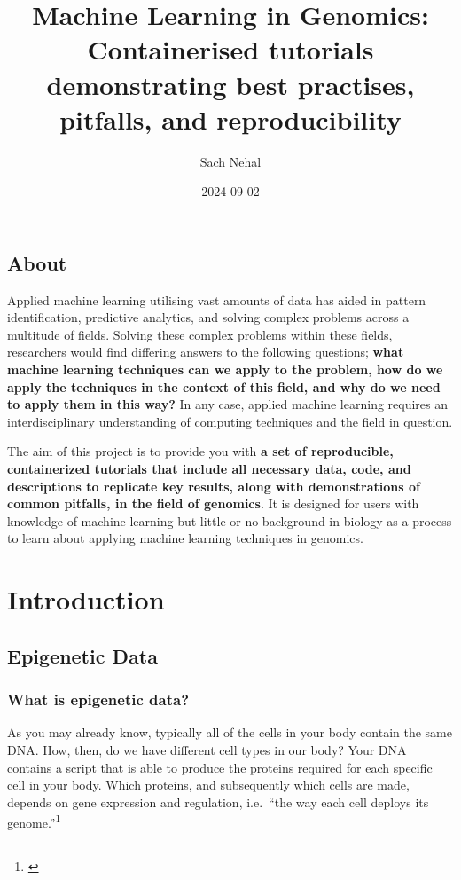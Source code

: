 \documentclass[
]{book}
\title{Machine Learning in Genomics: Containerised tutorials demonstrating best practises, pitfalls, and reproducibility}
\author{Sach Nehal}
\date{2024-09-02}
\begin{document}
\maketitle

{
\setcounter{tocdepth}{1}
\tableofcontents
}
\chapter*{About}\label{about}

Applied machine learning utilising vast amounts of data has aided in pattern identification, predictive analytics, and solving complex problems across a multitude of fields. Solving these complex problems within these fields, researchers would find differing answers to the following questions; \textbf{what machine learning techniques can we apply to the problem, how do we apply the techniques in the context of this field, and why do we need to apply them in this way?} In any case, applied machine learning requires an interdisciplinary understanding of computing techniques and the field in question.

The aim of this project is to provide you with \textbf{a set of reproducible, containerized tutorials that include all necessary data, code, and descriptions to replicate key results, along with demonstrations of common pitfalls, in the field of genomics}. It is designed for users with knowledge of machine learning but little or no background in biology as a process to learn about applying machine learning techniques in genomics.

\part{Introduction}\label{part-introduction}

\chapter{Epigenetic Data}\label{epigenetic-data}

\section{What is epigenetic data?}\label{what-is-epigenetic-data}

As you may already know, typically all of the cells in your body contain the same DNA. How, then, do we have different cell types in our body? Your DNA contains a script that is able to produce the proteins required for each specific cell in your body. Which proteins, and subsequently which cells are made, depends on gene expression and regulation, i.e.~``the way each cell deploys its genome.''\footnote{\citet{ralston2008}}
\end{document}
